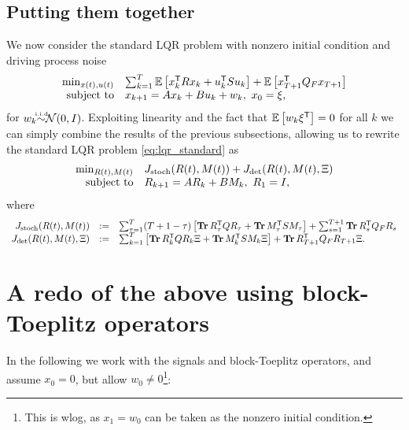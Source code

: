 \documentclass[11pt]{article}
\numberwithin{equation}{section}
\begin{document}
\subsection{Putting them together}
We now consider the standard LQR problem with nonzero initial condition and driving process noise
\begin{equation}
\begin{array}{rl}
\min_{x(t),u(t)} & \sum_{k=1}^T \mathbb{E}\left[x_k^{\mathsf{T}} R x_k + u_k^{\mathsf{T}} Su_k\right]+ \mathbb{E}\left[x_{T+1}^{\mathsf{T}} Q_F x_{T+1}\right]\\
\mbox{subject to} & x_{k+1} = Ax_k + Bu_k + w_k, \ x_0 = \xi,
\end{array}
\label{eq:lqr_standard}
\end{equation}
for $w_k {\iid}\mathcal{N}(0,I)$.  Exploiting linearity and the fact that $\mathbb{E}\left[ w_k\xi^{\mathsf{T}}\right] = 0$ for all $k$ we can simply combine the results of the previous subsections, allowing us to rewrite the standard LQR problem \eqref{eq:lqr_standard} as
\begin{equation}
\begin{array}{rl}
\min_{R(t),M(t)} & J_\mathrm{stoch}(R(t),M(t)) + J_\mathrm{det}(R(t),M(t),\Xi) \\
\mbox{subject to} & R_{k+1} = AR_k + BM_k, \ R_1 = I,
\end{array}
\label{eq:sls_LQR}
\end{equation}
where 
\begin{equation}
\begin{array}{rcl}
J_\mathrm{stoch}(R(t),M(t)) &:=& \sum_{\tau=1}^T (T+1-\tau)\left[\operatorname*{\mathbf{Tr}} R_\tau^{\mathsf{T}} Q R_\tau + \operatorname*{\mathbf{Tr}} M_\tau^{\mathsf{T}} S M_\tau\right] + \sum_{s=1}^{T+1} \operatorname*{\mathbf{Tr}} R_s^{\mathsf{T}} Q_F R_s \\
J_\mathrm{det}(R(t),M(t),\Xi) &:=& \sum_{k=1}^T\left[\operatorname*{\mathbf{Tr}} R_k^{\mathsf{T}} Q R_k\Xi + \operatorname*{\mathbf{Tr}} M_k^{\mathsf{T}} S M_k\Xi\right] +  \operatorname*{\mathbf{Tr}} R_{T+1}^{\mathsf{T}} Q_F R_{T+1}\Xi.
\end{array}
\end{equation}

\section{A redo of the above using block-Toeplitz operators}
In the following we work with the signals and block-Toeplitz operators, and assume $x_0 = 0$, but allow $w_0 \neq 0$\footnote{This is wlog, as $x_1 = w_0$ can be taken as the nonzero initial condition.}:
\end{document}
